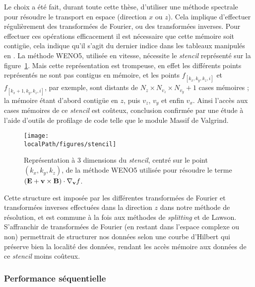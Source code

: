 Le choix a été fait, durant toute cette thèse, d'utiliser une méthode spectrale pour résoudre le transport en espace (direction $x$ ou $z$). Cela implique d'effectuer régulièrement des transformées de Fourier, ou des transformées inverses. Pour effectuer ces opérations efficacement il est nécessaire que cette mémoire soit contigüe, cela indique qu'il s'agit du dernier indice dans les tableaux manipulés en \CC. La méthode WENO5, utilisée en vitesse, nécessite le \emph{stencil} représenté sur la figure~\ref{fig:3:stencil}. Mais cette représentation est trompeuse, en effet les différents points représentés ne sont pas contigus en mémoire, et les points $f_{[k_x,k_y,k_z,i]}$ et $f_{[k_x+1,k_y,k_z,i]}$, par exemple, sont distants de $N_z\times N_{v_z} \times N_{v_y} + 1$ cases mémoires ; la mémoire étant d'abord contigüe en $z$, puis $v_z$, $v_y$ et enfin $v_x$. Ainsi l'accès aux cases mémoires de ce \emph{stencil} est coûteux, conclusion confirmée par une étude à l'aide d'outils de profilage de code telle que le module Massif de Valgrind.

\begin{figure}
  \centering
  \texttt{[image: \\localPath/figures/stencil]}
  \caption{Représentation à 3 dimensions du \emph{stencil}, centré sur le point $(k_x,k_y,k_z)$, de la méthode WENO5 utilisée pour résoudre le terme $(\vb{E}+\vb{v}\times\vb{B})\cdot\nabla_{\vb{v}}f$.}
  \label{fig:3:stencil}
\end{figure}

Cette structure est imposée par les différentes transformées de Fourier et transformées inverses effectuées dans la direction $z$ dans notre méthode de résolution, et est commune à la fois aux méthodes de \emph{splitting} et de Lawson. S'affranchir de transformées de Fourier (en restant dans l'espace complexe ou non) permettrait de structurer nos données selon une courbe d'Hilbert qui préserve bien la localité des données, rendant les accès mémoire aux données de ce \emph{stencil} moins coûteux.

\subsubsection{Performance séquentielle}


